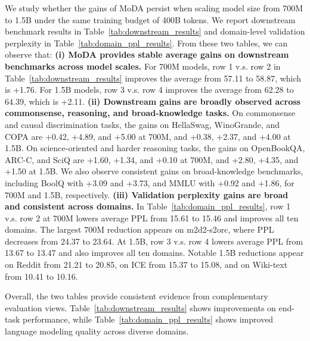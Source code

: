 \documentclass[]{bytedance_seed}
\newcommand{\name}{MoDA}
\begin{document}
We study whether the gains of \name{} persist when scaling model size from 700M to 1.5B under the same training budget of 400B tokens.
We report downstream benchmark results in Table~\ref{tab:downstream_results} and domain-level validation perplexity in Table~\ref{tab:domain_ppl_results}.
From these two tables, we can observe that:
\textbf{(i) \name{} provides stable average gains on downstream benchmarks across model scales.}
For 700M models, row 1 v.s. row 2 in Table~\ref{tab:downstream_results} improves the average from 57.11 to 58.87, which is +1.76.
For 1.5B models, row 3 v.s. row 4 improves the average from 62.28 to 64.39, which is +2.11.
\textbf{(ii) Downstream gains are broadly observed across commonsense, reasoning, and broad-knowledge tasks.}
On commonsense and causal discrimination tasks, the gains on HellaSwag, WinoGrande, and COPA are +0.42, +4.89, and +5.00 at 700M, and +0.38, +2.37, and +4.00 at 1.5B.
On science-oriented and harder reasoning tasks, the gains on OpenBookQA, ARC-C, and SciQ are +1.60, +1.34, and +0.10 at 700M, and +2.80, +4.35, and +1.50 at 1.5B.
We also observe consistent gains on broad-knowledge benchmarks, including BoolQ with +3.09 and +3.73, and MMLU with +0.92 and +1.86, for 700M and 1.5B, respectively.
\textbf{(iii) Validation perplexity gains are broad and consistent across domains.}
In Table~\ref{tab:domain_ppl_results}, row 1 v.s. row 2 at 700M lowers average PPL from 15.61 to 15.46 and improves all ten domains.
The largest 700M reduction appears on m2d2-s2orc, where PPL decreases from 24.37 to 23.64.
At 1.5B, row 3 v.s. row 4 lowers average PPL from 13.67 to 13.47 and also improves all ten domains.
Notable 1.5B reductions appear on Reddit from 21.21 to 20.85, on ICE from 15.37 to 15.08, and on Wiki-text from 10.41 to 10.16.

Overall, the two tables provide consistent evidence from complementary evaluation views.
Table~\ref{tab:downstream_results} shows improvements on end-task performance, while Table~\ref{tab:domain_ppl_results} shows improved language modeling quality across diverse domains.
\end{document}
